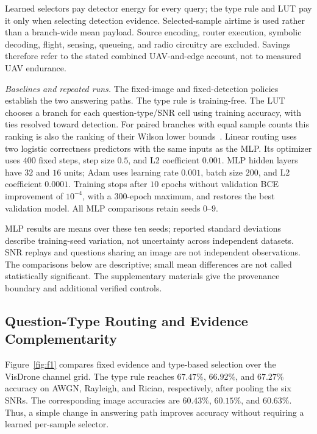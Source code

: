 Learned selectors pay detector energy for every query; the type
rule and LUT pay it only when selecting detection evidence.
Selected-sample airtime is used rather than a branch-wide mean
payload. Source encoding, router execution, symbolic decoding,
flight, sensing, queueing, and radio circuitry are excluded.
Savings therefore refer to the stated combined UAV-and-edge
account, not to measured UAV endurance.

\emph{Baselines and repeated runs.}\label{subsec:lcb}\label{subsec:stats}
The fixed-image and fixed-detection policies establish the two
answering paths. The type rule is training-free. The LUT chooses
a branch for each question-type/SNR cell using training accuracy,
with ties resolved toward detection. For paired branches with equal
sample counts this ranking is also the ranking of their Wilson
lower bounds~\cite{wilson1927probable}.
Linear routing uses two logistic correctness predictors with the
same inputs as the MLP. Its optimizer uses $400$ fixed steps,
step size $0.5$, and L2 coefficient $0.001$.
MLP hidden layers have $32$ and $16$ units; Adam uses learning rate
$0.001$, batch size $200$, and L2 coefficient $0.0001$.
Training stops after $10$ epochs without validation BCE improvement
of $10^{-4}$, with a $300$-epoch maximum, and restores the best
validation model. All MLP comparisons retain seeds $0$--$9$.

MLP results are means over these ten seeds; reported standard
deviations describe training-seed variation, not uncertainty across
independent datasets. SNR replays and questions sharing an image
are not independent observations. The comparisons below are
descriptive; small mean differences are not called statistically
significant. The supplementary materials give the provenance
boundary and additional verified controls.

\subsection{Question-Type Routing and Evidence Complementarity}
\label{subsec:main}\label{subsec:comp}\label{subsec:mechanism}
Figure~\ref{fig:f1} compares fixed evidence and type-based selection
over the VisDrone channel grid. The type rule reaches
$67.47\%$, $66.92\%$, and $67.27\%$ accuracy on AWGN, Rayleigh,
and Rician, respectively, after pooling the six SNRs.
The corresponding image accuracies are $60.43\%$, $60.15\%$,
and $60.63\%$. Thus, a simple change in answering path improves
accuracy without requiring a learned per-sample selector.

